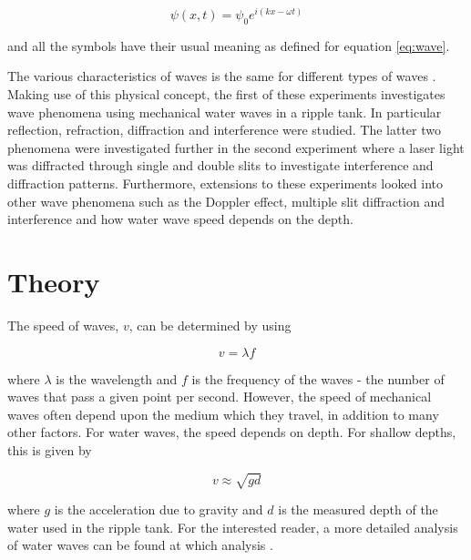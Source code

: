 \documentclass{article}
\begin{document}
\begin{equation}
\label{eq:complex-wave}
\psi(x, t) = \psi_0 e^{i(kx - \omega t)}
\end{equation}

\vspace{2mm}
\noindent
and all the symbols have their usual meaning as defined for equation \eqref{eq:wave}.

\vspace{2mm}
\noindent
The various characteristics of waves is the same for different types of waves \cite{Paper01}. Making use of this physical concept, the first of these experiments investigates wave phenomena using mechanical water waves in a ripple tank. In particular reflection, refraction, diffraction and interference were studied. The latter two phenomena were investigated further in the second experiment where a laser light was diffracted through single and double slits to investigate interference and diffraction patterns. Furthermore, extensions to these experiments looked into other wave phenomena such as the Doppler effect, multiple slit diffraction and interference and how water wave speed depends on the depth.


\section{Theory}
\label{sec:theory}

The speed of waves, $v$, can be determined by using 

\begin{equation}
\label{eq:water-waves}
v = \lambda f
\end{equation}

\vspace{2mm}
\noindent
where $\lambda$ is the wavelength and $f$ is the frequency of the waves - the number of waves that pass a given point per second. However, the speed of mechanical waves often depend upon the medium which they travel, in addition to many other factors. For water waves, the speed depends on depth. For shallow depths, this is given by \cite{Book02}

\begin{equation}
\label{eq:water-waves}
v \approx \sqrt{gd}
\end{equation}

\vspace{2mm}
\noindent
where $g$ is the acceleration due to gravity and $d$ is the measured depth of the water used in the ripple tank. For the interested reader, a more detailed analysis of water waves can be found at which analysis \cite{Book02}. 
\end{document}

